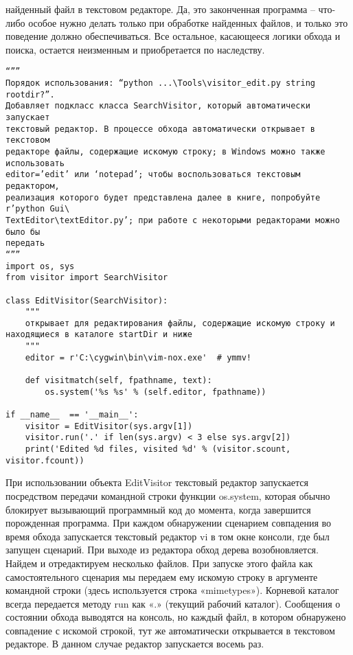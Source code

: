 \documentclass[12pt]{article}
\begin{document}
найденный файл в текстовом редакторе. Да, это законченная программа – что-либо особое нужно делать только при обработке найденных
файлов, и только это поведение должно обеспечиваться. Все остальное,
касающееся логики обхода и поиска, остается неизменным и приобретается по наследству.
\begin{verbatim}
“””
Порядок использования: “python ...\Tools\visitor_edit.py string rootdir?”.
Добавляет подкласс класса SearchVisitor, который автоматически запускает
текстовый редактор. В процессе обхода автоматически открывает в текстовом
редакторе файлы, содержащие искомую строку; в Windows можно также использовать
editor=’edit’ или ‘notepad’; чтобы воспользоваться текстовым редактором,
реализация которого будет представлена далее в книге, попробуйте r’python Gui\
TextEditor\textEditor.py’; при работе с некоторыми редакторами можно было бы
передать
“””
import os, sys
from visitor import SearchVisitor

class EditVisitor(SearchVisitor):
    """
    открывает для редактирования файлы, содержащие искомую строку и
находящиеся в каталоге startDir и ниже
    """
    editor = r'C:\cygwin\bin\vim-nox.exe'  # ymmv!

    def visitmatch(self, fpathname, text):
        os.system('%s %s' % (self.editor, fpathname))

if __name__  == '__main__':
    visitor = EditVisitor(sys.argv[1])
    visitor.run('.' if len(sys.argv) < 3 else sys.argv[2])
    print('Edited %d files, visited %d' % (visitor.scount, visitor.fcount))
\end{verbatim}
При использовании объекта EditVisitor текстовый редактор запускается посредством передачи командной строки функции os.system, которая
обычно блокирует вызывающий программный код до момента, когда
завершится порожденная программа. При каждом
обнаружении сценарием совпадения во время обхода запускается текстовый редактор vi в том окне консоли, где был запущен сценарий. При
выходе из редактора обход дерева возобновляется.
Найдем и отредактируем несколько файлов. При запуске этого файла
как самостоятельного сценария мы передаем ему искомую строку в аргументе командной строки (здесь используется строка «mimetypes»).
Корневой каталог всегда передается методу run как «.» (текущий рабочий каталог). Сообщения о состоянии обхода выводятся на консоль, но
каждый файл, в котором обнаружено совпадение с искомой строкой,
тут же автоматически открывается в текстовом редакторе. В данном
случае редактор запускается восемь раз.
\end{document}
